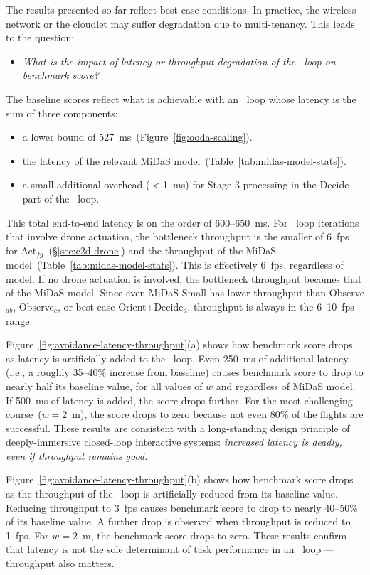The results presented so far reflect best-case conditions.  In
practice, the wireless network or the cloudlet may suffer degradation
due to multi-tenancy.  This leads to the question:
\begin{itemize}
\item{\em What is the impact of latency or throughput degradation of
    the \ooda~loop on benchmark score?}
\end{itemize}
The baseline scores reflect what is
achievable with an \ooda~loop whose latency is the sum of three
components:
\begin{itemize}
\item{a lower bound of 527~ms~(Figure~\ref{fig:ooda-scaling}).}

\item{the latency of the relevant MiDaS model~(Table~\ref{tab:midas-model-stats}).}

\item{a small additional overhead ($<$1~ms) for Stage-3 processing
    in the Decide part of the \ooda~loop.}
\end{itemize}

This total end-to-end latency is on the order of 600--650~ms.  For
\ooda~loop iterations that involve drone actuation, the bottleneck
throughput is the smaller of 6~fps for
Act$_{fg}$~(\S\ref{sec:c2d-drone}) and the throughput of the MiDaS
model~(Table~\ref{tab:midas-model-stats}).  This is effectively
6~fps, regardless of model.  If no drone actuation is involved, the
bottleneck throughput becomes that of the MiDaS model.  Since even
MiDaS Small has lower throughput than Observe$_{ab}$, Observe$_{c}$,
or best-case Orient+Decide$_d$, throughput is always in the 6--10~fps
range.

Figure~\ref{fig:avoidance-latency-throughput}(a) shows how benchmark
score drops as latency is artificially added to the \ooda~loop.  Even
250~ms of additional latency (i.e., a roughly 35--40\% increase from
baseline) causes benchmark score to drop to nearly half its baseline
value, for all values of $w$ and regardless of MiDaS model.  If 500~ms
of latency is added, the score drops further.  For the most
challenging course~($w = 2$~m), the score drops to zero because not
even 80\% of the flights are successful.  These results are consistent
with a long-standing design principle of deeply-immersive closed-loop
interactive systems: {\em increased latency is deadly, even if
  throughput remains good.}

Figure~\ref{fig:avoidance-latency-throughput}(b) shows how benchmark
score drops as the throughput of the \ooda~loop is artificially
reduced from its baseline value.  Reducing throughput to 3~fps causes
benchmark score to drop to nearly 40--50\% of its baseline value.  A
further drop is observed when throughput is reduced to 1~fps.  For $w
= 2$~m, the benchmark score drops to zero.  These results confirm that
latency is not the sole determinant of task performance in an
\ooda~loop --- throughput also matters.

